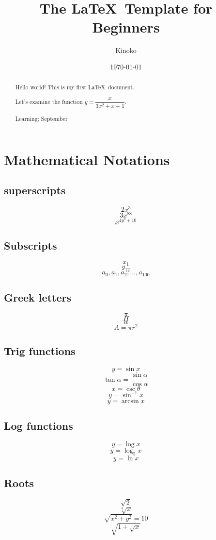 \documentclass[12pt, a4paper]{article}
\title{The \LaTeX\ Template for Beginners}
\author{Kinoko}
\date{\today}
\def\eq11{$y=\dfrac{x}{3x^2+x+1}$}
\begin{document}
\maketitle

\begin{abstract}
    Hello world! This is my first \LaTeX\ document. 

    Let's examine the function \eq11.

    \lipsum[1]

    \begin{keywords}
    Learning; September
    \end{keywords}
\end{abstract}
\newpage
\tableofcontents
\newpage

\section{Mathematical Notations}
\subsection{superscripts} 
$$2x^3$$
$$3x^{88}$$
$$x^{4y^9+10}$$

\subsection{Subscripts}
$$x_1$$
$$y_{12}$$
$$a_0,a_1,a_2,\dots,a_{100}$$

\subsection{Greek letters}
$$\pi$$
$$\Pi$$
$$\alpha$$
$$A=\pi r^2$$

\subsection{Trig functions}
$$y=\sin x$$
$$\tan \alpha=\frac{\sin \alpha}{\cos \alpha}$$
$$x=\csc \theta$$
$$y=\sin^{-1}x$$
$$y=\arcsin x$$

\subsection{Log functions}
$$y=\log x$$
$$y=\log_5  x$$
$$y=\ln x$$

\subsection{Roots}
$$\sqrt2$$
$$\sqrt[3]{x}$$
$$\sqrt{x^2+y^2}=10$$
$$\sqrt{  1+\sqrt{x}  }$$
\end{document}
